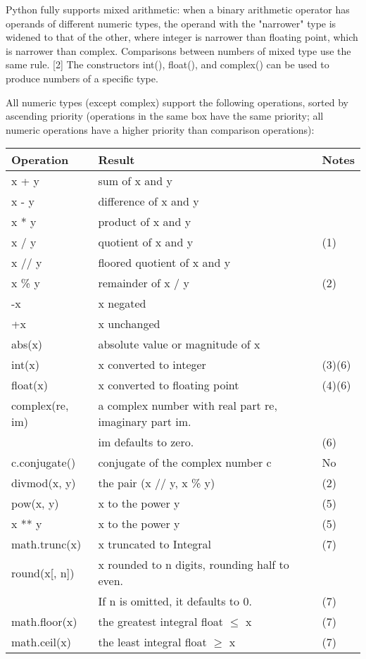 \vpara
Python fully supports mixed arithmetic: when a binary arithmetic operator has operands of different numeric types, the operand with the "narrower" type is widened to that of the other, where integer is narrower than floating point, which is narrower than complex. Comparisons between numbers of mixed type use the same rule. [2] The constructors int(), float(), and complex() can be used to produce numbers of a specific type.

\vpara
All numeric types (except complex) support the following operations, sorted by ascending priority (operations in the same box have the same priority; all numeric operations have a higher priority than comparison operations):


\begin{table}[ht]
	\centering
	\begin{tabular}{|l|l|l|}
		\hline
		Operation & Result & Notes\\
		\hline
		x + y & sum of x and y &   \\
		x - y & difference of x and y &   \\
		x * y & product of x and y &   \\				
		x / y & quotient of x and y &  (1) \\
		x // y & floored quotient of x and y &  \\
		x \% y & remainder of x / y &  (2) \\				
		-x & x negated &   \\
		+x & x unchanged &   \\
		abs(x) & absolute value or magnitude of x &   \\
		int(x) & x converted to integer &  (3)(6) \\
		float(x) & x converted to floating point &  (4)(6) \\
		complex(re, im) & a complex number with real part re, imaginary part im. &  \\
		 & im defaults to zero. &  (6) \\
		c.conjugate() & conjugate of the complex number c &  No \\
		divmod(x, y) & the pair (x // y, x \% y) &  (2) \\
		pow(x, y)  & x to the power y &  (5) \\
		x ** y &  x to the power y &  (5) \\
		math.trunc(x) &  x truncated to Integral &  (7) \\
		round(x[, n]) &  x rounded to n digits, rounding half to even. & \\
		 & If n is omitted, it defaults to 0. &  (7) \\
		math.floor(x) &  the greatest integral float $\le$ x &  (7) \\
		math.ceil(x) &  the least integral float $\ge$ x &  (7) \\
		\hline
	\end{tabular}
\end{table}
    


